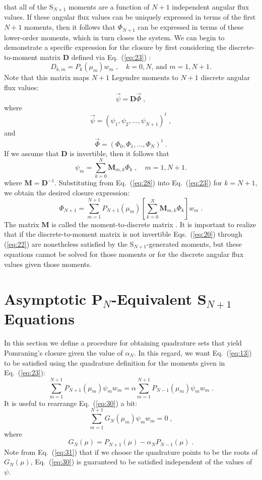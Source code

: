 \documentclass[12pt]{article}
\newcommand{\bracket}[1]{\left[ #1 \right]}
\newcommand{\fn}[1]{\left( #1 \right)}
\renewcommand{\vec}[1]{\overrightarrow{#1}}
\newcommand{\be}{\begin{equation}}
\newcommand{\ee}{\end{equation}}
\newcommand{\pec}{\; ,}
\newcommand{\pep}{\; .}
\newcommand{\LEQ}[1]{\label{eq:#1}}
\newcommand{\EQ}[1]{Eq.~(\ref{eq:#1})}
\newcommand{\REQ}[1]{\ref{eq:#1}}
\newcommand{\bc}{\begin{center}}
\newcommand{\ec}{\end{center}}
\begin{document}
that all of the S$_{N+1}$ moments are a function of $N+1$ independent angular flux values. If these angular flux values can 
be uniquely expressed in terms of the first $N+1$ moments, then it follows that $\Phi_{N+1}$ can be expressed in terms of 
these lower-order moments, which in turn closes the system.  We can begin to demonstrate a specific expression for the 
closure by first considering the discrete-to-moment matrix $\mathbf{D}$ defined via \EQ{23} \cite{morel}:
\be
D_{k,m} = P_{k}(\mu_m) w_m \pec \quad \mbox{$k=0,N$, and $m=1,N+1$}.  
\LEQ{24}
\ee
Note that this matrix maps $N+1$ Legendre moments to $N+1$ discrete angular flux values:
\be
\vec{\psi} = \mathbf{D}\vec{\Phi} \pec
\LEQ{25}
\ee
where
\be
\vec{\psi} = \fn{\psi_1,\psi_2, \ldots ,\psi_{N+1}}^t \pec
\LEQ{26}
\ee
and
\be
\vec{\Phi} = \fn{\Phi_0,\Phi_1, \ldots ,\Phi_{N}}^t \pep
\LEQ{27}
\ee
If we assume that $\mathbf{D}$ is invertible, then it follows that 
\be
\psi_m = \sum_{k=0}^{N} \mathbf{M}_{m,k} \Phi_k \pec \quad m=1,N+1.
\LEQ{28}
\ee
where $\mathbf{M}=\mathbf{D}^{-1}$. 
Substituting from \EQ{28} into \EQ{23} for $k=N+1$, we obtain the desired closure expression:
\be
\Phi_{N+1} = \sum_{m=1}^{N+1} P_{N+1}(\mu_m) \bracket{\sum_{k=0}^{N} \mathbf{M}_{m,k} \Phi_k } w_m \pep
\LEQ{29}
\ee
The matrix $\mathbf{M}$ is called the moment-to-discrete matrix \cite{morel}. It is important to realize 
that if the discrete-to-moment matrix is not invertible Eqs.~(\REQ{20}) through (\REQ{22}) are nonetheless 
satisfied by the S$_{N+1}$-generated moments, but these equations cannot be solved for those moments or  
for the discrete angular flux values given those moments. 

\section{Asymptotic P$_{N}$-Equivalent S$_{N+1}$ Equations}


In this section we define a procedure for obtaining quadrature sets that yield Pomraning's closure given 
the value of $\alpha_N$.  In this regard, we want \EQ{13} to be satisfied using the quadrature definition for 
the moments given in \EQ{23}:
\be
\sum_{m=1}^{N+1} P_{N+1}(\mu_m) \psi_m w_m = \alpha \sum_{m=1}^{N+1} P_{N-1}(\mu_m) \psi_m w_m  \pep
\LEQ{30}
\ee
It is useful to rearrange \EQ{30} a bit:
\be
\sum_{m=1}^{N+1} G_N(\mu_m) \psi_m w_m = 0 \pec
\LEQ{31}
\ee
where 
\be
G_N(\mu) = P_{N+1}(\mu) - \alpha_N P_{N-1}(\mu)\pep
\LEQ{32}
\ee
Note from \EQ{31} that if we choose the quadrature points to be the roots of $G_{N}(\mu)$, \EQ{30} is guaranteed 
to be satisfied independent of the values of $\psi$.
\end{document}
